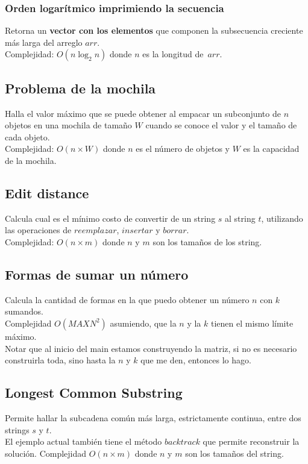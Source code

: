 \documentclass[10pt,letterpaper,twocolumn]{article}
\newcommand{\source}[1]{
  
  \dotfill
}
\begin{document}
    \subsubsection{Orden logarítmico imprimiendo la secuencia}
      Retorna un \textbf{vector con los elementos} que componen la subsecuencia creciente más larga del arreglo $arr$.\\
      Complejidad: $O(n \log_2 n)$ donde $n$ es la longitud de~$arr$.
      \source{src/lislognelements.cpp}
  \subsection{Problema de la mochila}
  Halla el valor máximo que se puede obtener al empacar un subconjunto de $n$ objetos en una mochila de tamaño $W$ cuando se conoce el valor y el tamaño de cada objeto.\\
Complejidad: $O(n \times W)$ donde $n$ es el número de objetos y $W$ es la capacidad de la mochila.\\
  \source{./src/knapsack.cpp}
  \subsection{Edit distance}
  Calcula cual es el mínimo costo de convertir de un string $s$ al string $t$, utilizando las operaciones de $reemplazar$, $insertar$ y $borrar$.\\
  Complejidad: $O(n \times m)$ donde $n$ y $m$ son los tamaños de los string.
  \source{./src/editDistance.cpp}
  \subsection{Formas de sumar un número}
  Calcula la cantidad de formas en la que puedo obtener un número $n$ con $k$ sumandos.\\
  Complejidad $O(MAXN^2)$ asumiendo, que la $n$ y la $k$ tienen el mismo límite máximo.\\
  Notar que al inicio del main estamos construyendo la matriz, si no es necesario construirla toda, sino hasta la $n$ y $k$ que me den, entonces lo hago.\\
  \source{./src/waysToAdd.cpp}
  \subsection{Longest Common Substring}
  Permite hallar la subcadena común más larga, estrictamente continua, entre dos strings $s$ y $t$.\\
  El ejemplo actual también tiene el método $backtrack$ que permite reconstruir la solución.
  Complejidad $O(n \times m)$ donde $n$ y $m$ son los tamaños del string.
  \source{./src/longestSubString.cpp}
\end{document}
